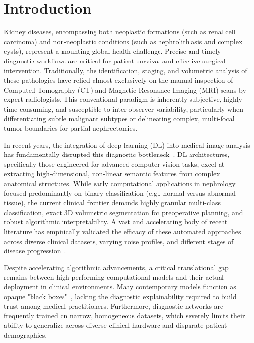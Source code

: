 \section{Introduction}
\label{sec:intro}

Kidney diseases, encompassing both neoplastic formations (such as renal cell carcinoma) and non-neoplastic conditions (such as nephrolithiasis and complex cysts), represent a mounting global health challenge. Precise and timely diagnostic workflows are critical for patient survival and effective surgical intervention. Traditionally, the identification, staging, and volumetric analysis of these pathologies have relied almost exclusively on the manual inspection of Computed Tomography (CT) and Magnetic Resonance Imaging (MRI) scans by expert radiologists. This conventional paradigm is inherently subjective, highly time-consuming, and susceptible to inter-observer variability, particularly when differentiating subtle malignant subtypes or delineating complex, multi-focal tumor boundaries for partial nephrectomies.

In recent years, the integration of deep learning (DL) into medical image analysis has fundamentally disrupted this diagnostic bottleneck~\cite{degadwala2024review}. DL architectures, specifically those engineered for advanced computer vision tasks, excel at extracting high-dimensional, non-linear semantic features from complex anatomical structures. While early computational applications in nephrology focused predominantly on binary classification (e.g., normal versus abnormal tissue), the current clinical frontier demands highly granular multi-class classification, exact 3D volumetric segmentation for preoperative planning, and robust algorithmic interpretability. A vast and accelerating body of recent literature has empirically validated the efficacy of these automated approaches across diverse clinical datasets, varying noise profiles, and different stages of disease progression~\cite{aljohani2025hierarchical, obaid2025noisy, khan2025multilevel, verma2025automated, rehman2024kidney, scales2012prevalence, wang2022survival, rajendran2025kidney}.

Despite accelerating algorithmic advancements, a critical translational gap remains between high-performing computational models and their actual deployment in clinical environments. Many contemporary models function as opaque "black boxes"~\cite{kadhim2024machine}, lacking the diagnostic explainability required to build trust among medical practitioners. Furthermore, diagnostic networks are frequently trained on narrow, homogeneous datasets, which severely limits their ability to generalize across diverse clinical hardware and disparate patient demographics.

